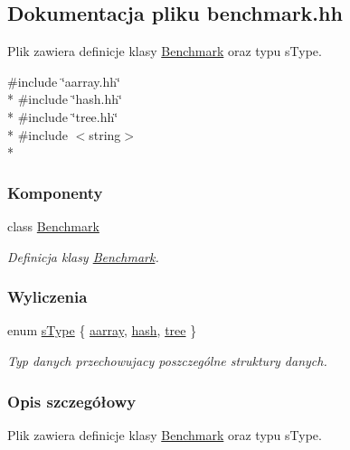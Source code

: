\hypertarget{benchmark_8hh}{\subsection{Dokumentacja pliku benchmark.\-hh}
\label{benchmark_8hh}
}


Plik zawiera definicje klasy \hyperlink{class_benchmark}{Benchmark} oraz typu s\-Type.  


{\ttfamily \#include \char`\"{}aarray.\-hh\char`\"{}}\\*
{\ttfamily \#include \char`\"{}hash.\-hh\char`\"{}}\\*
{\ttfamily \#include \char`\"{}tree.\-hh\char`\"{}}\\*
{\ttfamily \#include $<$string$>$}\\*
\subsubsection*{Komponenty}
\begin{DoxyCompactItemize}
\item 
class \hyperlink{class_benchmark}{Benchmark}
\begin{DoxyCompactList}\small\item\em Definicja klasy \hyperlink{class_benchmark}{Benchmark}. \end{DoxyCompactList}\end{DoxyCompactItemize}
\subsubsection*{Wyliczenia}
\begin{DoxyCompactItemize}
\item 
enum \hyperlink{benchmark_8hh_aea0d9887a477b37857cd2037b9c9ad31}{s\-Type} \{ \hyperlink{benchmark_8hh_aea0d9887a477b37857cd2037b9c9ad31a610bf4b52747a9873a667e259b6bf10d}{aarray}, 
\hyperlink{benchmark_8hh_aea0d9887a477b37857cd2037b9c9ad31afeef2a68a563607337354c6054e98743}{hash}, 
\hyperlink{benchmark_8hh_aea0d9887a477b37857cd2037b9c9ad31a9d9f0ad70d95b267fda40075d0c175a8}{tree}
 \}
\begin{DoxyCompactList}\small\item\em Typ danych przechowujacy poszczególne struktury danych. \end{DoxyCompactList}\end{DoxyCompactItemize}


\subsubsection{Opis szczegółowy}
Plik zawiera definicje klasy \hyperlink{class_benchmark}{Benchmark} oraz typu s\-Type. 

